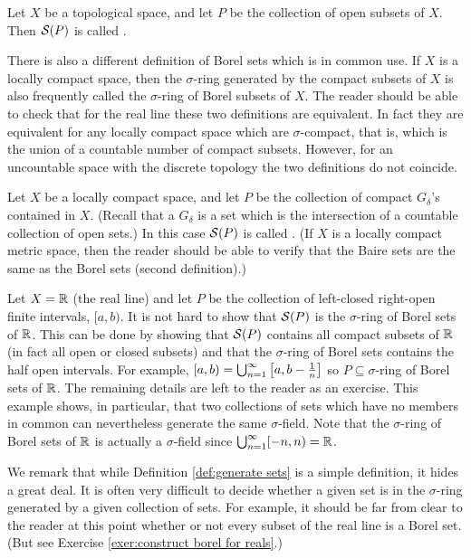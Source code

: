 \begin{example}
Let $X$ be a topological space, and let $P$ be the collection of open subsets of $X$. Then ${\cal S}(P)$ is called .
\end{example}

There is also a different definition of Borel sets which is in common use. If $X$ is a locally compact space, then the $\sigma$-ring generated by the compact subsets of $X$ is also frequently called the $\sigma$-ring of Borel subsets of $X$. The reader should be able to check that for the real line these two definitions are equivalent. In fact they are equivalent for any locally compact space which are $\sigma$-compact, that is, which is the union of a countable number of compact subsets. However, for an uncountable space with the discrete topology the two definitions do not coincide.

\begin{example}
Let $X$ be a locally compact space, and let $P$ be the collection of compact $G_\delta$'s contained in $X$. (Recall that a $G_\delta$ is a set which is the intersection of a countable collection of open sets.) In this case ${\cal S}(P)$ is called . (If $X$ is a locally compact metric space, then the reader should be able to verify that the Baire sets are the same as the Borel sets (second definition).)
\end{example}

\begin{example}\label{ex:borel for reals}
Let $X=\mathbb{R}$ (the real line) and let $P$ be the collection of left-closed right-open finite intervals, $[a,b)$. It is not hard to show that ${\cal S}(P)$ is the $\sigma$-ring of Borel sets of $\mathbb{R}$. This can be done by showing that ${\cal S}(P)$ contains all compact subsets of $\mathbb{R}$ (in fact all open or closed subsets) and that the $\sigma$-ring of Borel sets contains the half open intervals. For example, $[a,b)=\bigcup_{n=1}^\infty\left[a,b-\frac1n\right]$ so $P\subseteq\sigma$-ring of Borel sets of $\mathbb{R}$. The remaining details are left to the reader as an exercise. This example shows, in particular, that two collections of sets which have no members in common can nevertheless generate the same $\sigma$-field. Note that the $\sigma$-ring of Borel sets of $\mathbb{R}$ is actually a $\sigma$-field since $\bigcup_{n=1}^\infty[-n,n)=\mathbb{R}$.
\end{example}

We remark that while Definition \ref{def:generate sets} is a simple definition, it hides a great deal. It is often very difficult to decide whether a given set is in the $\sigma$-ring generated by a given collection of sets. For example, it should be far from clear to the reader at this point whether or not every subset of the real line is a Borel set. (But see Exercise \ref{exer:construct borel for reals}.)


